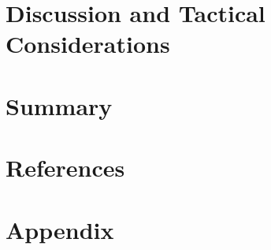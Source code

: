 \documentclass[12pt,oneside]{book}
\begin{document}
	\chapter{Discussion and Tactical Considerations}
	\label{chap:Discussion_and_Tactical_Considerations}
	
	\chapter{Summary}
	\label{chap:Summary}
	
	\chapter{References}
	\label{chap:References}
	
	\chapter{Appendix}
	\label{chap:Appendix}
	
	
	\clearpage
	
	
	
	
\end{document}
